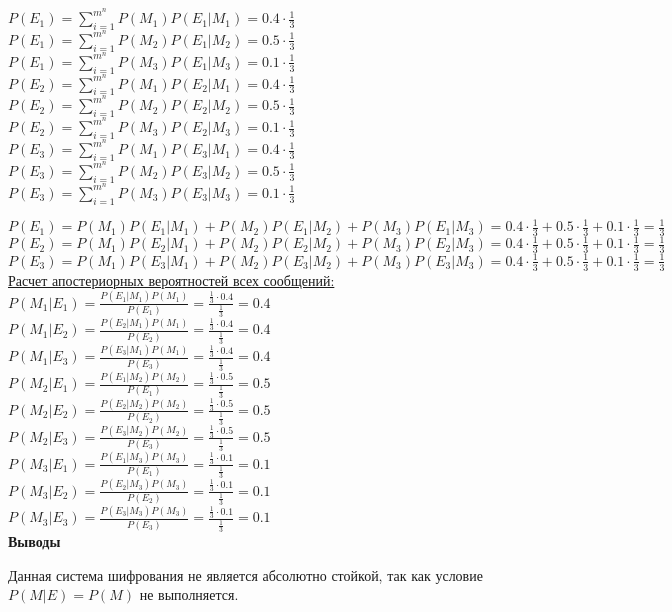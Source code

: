\documentclass[a4paper,14pt]{extarticle}
\begin{document}
    \begin{multicols}{2}
    \noindent$P(E_1)=\sum\limits_{i=1}^{m^n} P(M_1)P(E_1|M_1) = 0.4\cdot\frac{1}{3}$\\
    $P(E_1)=\sum\limits_{i=1}^{m^n} P(M_2)P(E_1|M_2) = 0.5\cdot\frac{1}{3}$\\
    $P(E_1)=\sum\limits_{i=1}^{m^n} P(M_3)P(E_1|M_3) = 0.1\cdot\frac{1}{3}$\\
    $P(E_2)=\sum\limits_{i=1}^{m^n} P(M_1)P(E_2|M_1) = 0.4\cdot\frac{1}{3}$\\
    $P(E_2)=\sum\limits_{i=1}^{m^n} P(M_2)P(E_2|M_2) = 0.5\cdot\frac{1}{3}$\\
    $P(E_2)=\sum\limits_{i=1}^{m^n} P(M_3)P(E_2|M_3) = 0.1\cdot\frac{1}{3}$\\
    $P(E_3)=\sum\limits_{i=1}^{m^n} P(M_1)P(E_3|M_1) = 0.4\cdot\frac{1}{3}$\\
    $P(E_3)=\sum\limits_{i=1}^{m^n} P(M_2)P(E_3|M_2) = 0.5\cdot\frac{1}{3}$\\
    $P(E_3)=\sum\limits_{i=1}^{m^n} P(M_3)P(E_3|M_3) = 0.1\cdot\frac{1}{3}$\\
    \end{multicols}
    \noindent$P(E_1)=P(M_1)P(E_1|M_1)+P(M_2)P(E_1|M_2)+P(M_3)P(E_1|M_3)=0.4\cdot\frac{1}{3}+0.5\cdot\frac{1}{3}+0.1\cdot\frac{1}{3}=\frac{1}{3}$\\
    $P(E_2)=P(M_1)P(E_2|M_1)+P(M_2)P(E_2|M_2)+P(M_3)P(E_2|M_3)=0.4\cdot\frac{1}{3}+0.5\cdot\frac{1}{3}+0.1\cdot\frac{1}{3}=\frac{1}{3}$\\
    $P(E_3)=P(M_1)P(E_3|M_1)+P(M_2)P(E_3|M_2)+P(M_3)P(E_3|M_3)=0.4\cdot\frac{1}{3}+0.5\cdot\frac{1}{3}+0.1\cdot\frac{1}{3}=\frac{1}{3}$\\
    \newpage
    \underline{Расчет апостериорных вероятностей всех сообщений:}\\
    \noindent$P(M_1|E_1)=\frac{P(E_1|M_1)P(M_1)}{P(E_1)}=\frac{\frac{1}{3}\cdot0.4}{\frac{1}{3}}=0.4$\\
    $P(M_1|E_2)=\frac{P(E_2|M_1)P(M_1)}{P(E_2)}=\frac{\frac{1}{3}\cdot0.4}{\frac{1}{3}}=0.4$\\
    $P(M_1|E_3)=\frac{P(E_3|M_1)P(M_1)}{P(E_3)}=\frac{\frac{1}{3}\cdot0.4}{\frac{1}{3}}=0.4$\\
    $P(M_2|E_1)=\frac{P(E_1|M_2)P(M_2)}{P(E_1)}=\frac{\frac{1}{3}\cdot0.5}{\frac{1}{3}}=0.5$\\
    $P(M_2|E_2)=\frac{P(E_2|M_2)P(M_2)}{P(E_2)}=\frac{\frac{1}{3}\cdot0.5}{\frac{1}{3}}=0.5$\\
    $P(M_2|E_3)=\frac{P(E_3|M_2)P(M_2)}{P(E_3)}=\frac{\frac{1}{3}\cdot0.5}{\frac{1}{3}}=0.5$\\
    $P(M_3|E_1)=\frac{P(E_1|M_3)P(M_3)}{P(E_1)}=\frac{\frac{1}{3}\cdot0.1}{\frac{1}{3}}=0.1$\\
    $P(M_3|E_2)=\frac{P(E_2|M_3)P(M_3)}{P(E_2)}=\frac{\frac{1}{3}\cdot0.1}{\frac{1}{3}}=0.1$\\
    $P(M_3|E_3)=\frac{P(E_3|M_3)P(M_3)}{P(E_3)}=\frac{\frac{1}{3}\cdot0.1}{\frac{1}{3}}=0.1$\\
    \textbf{Выводы}

    Данная система шифрования не является абсолютно стойкой, так как условие $P(M|E)=P(M)$ не выполняется.
\end{document}
